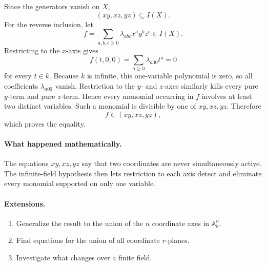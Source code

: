 Since the generators vanish on \(X\),
\[
(xy,xz,yz)\subseteq I(X).
\]
For the reverse inclusion, let
\[
f=\sum_{a,b,c\ge0}\lambda_{abc}x^ay^bz^c\in I(X).
\]
Restricting to the \(x\)-axis gives
\[
f(t,0,0)=\sum_{a\ge0}\lambda_{a00}t^a=0
\]
for every \(t\in k\).  Because \(k\) is infinite, this one-variable polynomial is zero, so
all coefficients \(\lambda_{a00}\) vanish.  Restriction to the \(y\)- and \(z\)-axes
similarly kills every pure \(y\)-term and pure \(z\)-term.  Hence every monomial occurring
in \(f\) involves at least two distinct variables.  Such a monomial is divisible by one of
\(xy,xz,yz\).  Therefore
\[
f\in(xy,xz,yz),
\]
which proves the equality.

\paragraph{What happened mathematically.}
The equations \(xy,xz,yz\) say that two coordinates are never simultaneously active.  The
infinite-field hypothesis then lets restriction to each axis detect and eliminate every
monomial supported on only one variable.

\paragraph{Extensions.}
\begin{enumerate}
\item Generalize the result to the union of the \(n\) coordinate axes in \(\mathbb A_k^n\).
\item Find equations for the union of all coordinate \(r\)-planes.
\item Investigate what changes over a finite field.
\end{enumerate}
\fi
